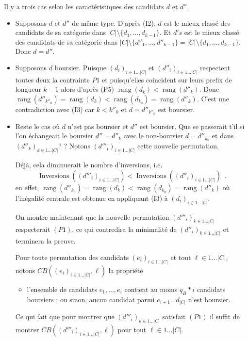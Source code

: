 \documentclass{article}
\DeclareMathOperator{\rang}{rang}
\DeclareMathOperator{\Inversions}{Inversions}
\begin{document}
Il y a trois cas selon les caractéristiques des candidats $d$ et $d''$.
\begin{itemize}
\item
Supposons $d$ et $d''$  de même type. D'après (I2), 
$d$ est le mieux classé des candidats de sa catégorie dans
$|C|\setminus \{d_1,\ldots, d_{k-1}\}$.
Et $d's$ est le mieux classé des candidats de sa catégorie dans
$|C|\setminus \{d''_1,\ldots, d''_{k-1}\} = |C|\setminus \{d_1,\ldots, d_{k-1}\} $.
Donc $d=d''$.
\item

Supposons $d$  boursier. 
% 
Puisque $(d_i)_{i\in 1\ldots |C|}$ et $(d''_i)_{i\in 1\ldots |C|}$ 
respectent toutes deux la contrainte $P1$
et puisqu'elles coincident sur leurs prefix de longueur $k-1$
alors d'après (P5) $\rang(d_k) < \rang(d''_k)$.
Donc $\rang(d''_{k''_0}) = \rang(d_k) < \rang(d_{k_0}) = \rang(d''_k)$.
C'est une contradiction avec (I3) car $k < k''_0$ et $d = d''_{k''_0}$ est boursier.

\item

Reste le cas où $d$ n'est pas boursier et $d''$ est boursier.
Que se passerait t'il si l'on échangeait le boursier $d''=d''_k$
avec le non-boursier $d=d''_{k_0}$ et  dans $(d''_k)_{k\in 1 \ldots |C|}$?
?
Notons $(d'''_i)_{i\in 1 \ldots |C|}$ cette nouvelle permutation.

Déjà, cela diminuerait le nombre d'inversions,
i.e.
\[
\Inversions((d'''_i)_{i\in 1 \ldots |C|}) < \Inversions((d''_i)_{i\in 1 \ldots |C|})\enspace.
\]
en effet, $\rang(d''_{k_0}) = \rang(d_k) < \rang(d_{k_0}) = \rang(d''_k)$
où l'inégalité centrale est obtenue en appliquant (I3)
à $(d_i)_{i\in 1 \ldots |C|}$.

On montre maintenant que la nouvelle permutation $(d'''_i)_{k\in 1 \ldots |C|}$ respecterait $(P1)$,
ce qui contredira la minimalité de $(d''_i)_{k\in 1 \ldots |C|}$ et terminera la preuve.

Pour toute permutation des candidats $(e_i)_{i\in 1\ldots |C|}$
et tout $\ell \in 1 \ldots |C|$, notons $CB((e_i)_{i\in 1\ldots |C|},\ell)$
la propriété
\begin{itemize}
 \item[]  l'ensemble de candidats $e_1,\ldots,e_i$ contient au moins $q_B  * i$  candidats boursiers ; ou sinon, aucun candidat parmi $e_{i+1}\ldots d_{|C|}$ n'est boursier.
\end{itemize}
Ce qui fait que pour montrer que $(d'''_i)_{k\in 1 \ldots |C|}$ satisfait $(P1)$
il suffit de montrer $CB((d'''_i)_{i\in 1\ldots |C|},\ell)$ pour tout $\ell \in 1 \ldots |C|$.


\end{itemize}
\end{document}
